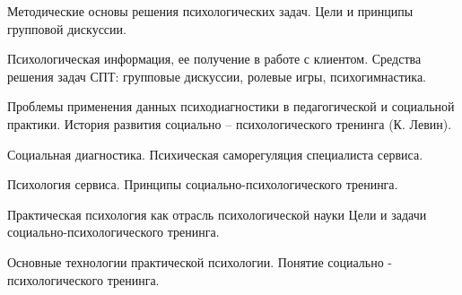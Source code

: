 \documentclass[
	14pt,
	a4paper,
	]
	{scrartcl}
\begin{document}
\vfill

\newpage


\shapk
{}
\setcounter{zad}{0}

\vfill
\z Методические основы решения психологических задач.
 \vfill
\z Цели и принципы групповой дискуссии.
 \vfill

\vfill

\newpage


\shapk
{}
\setcounter{zad}{0}

\vfill
\z Психологическая информация, ее получение в работе с клиентом.
 \vfill
\z Средства решения задач СПТ: групповые дискуссии, ролевые игры, психогимнастика.
 \vfill

\vfill

\newpage


\shapk
{}
\setcounter{zad}{0}

\vfill
\z Проблемы применения данных психодиагностики в педагогической и социальной практики.
 \vfill
\z История развития социально – психологического тренинга (К. Левин).
 \vfill

\vfill

\newpage


\shapk
{}
\setcounter{zad}{0}

\vfill
\z Социальная диагностика.
 \vfill
\z Психическая саморегуляция специалиста сервиса.
 \vfill

\vfill

\newpage


\shapk
{}
\setcounter{zad}{0}

\vfill
\z Психология сервиса.
 \vfill
\z Принципы социально-психологического тренинга.
 \vfill

\vfill

\newpage


\shapk
{}
\setcounter{zad}{0}

\vfill
\z Практическая психология как отрасль психологической науки
 \vfill
\z Цели и задачи социально-психологического тренинга.
 \vfill

\vfill

\newpage


\shapk
{}
\setcounter{zad}{0}

\vfill
\z Основные технологии практической психологии.
 \vfill
\z Понятие социально - психологического тренинга.
 \vfill

\vfill
\end{document}

